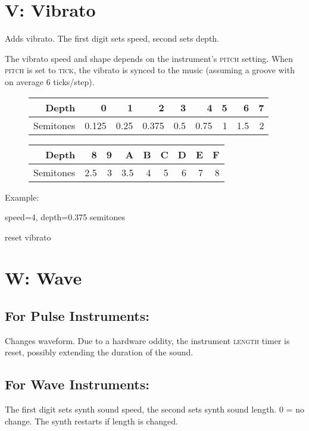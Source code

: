 \section{V: Vibrato}

Adds vibrato. The first digit sets speed, second sets depth.

The vibrato speed and shape depends on the instrument's \textsc{pitch} setting. When \textsc{pitch} is set to \textsc{tick}, the vibrato is synced to the music (assuming a groove with on average 6 ticks/step).

\begin{figure}[hbtp]
    \begin{tabular}{r|r|r|r|r|r|r|r|r}
        Depth & 0 & 1 & 2 & 3 & 4 & 5 & 6 & 7 \\
        \hline
        Semitones & 0.125 & 0.25 & 0.375 & 0.5 & 0.75 & 1 & 1.5 & 2 \\
    \end{tabular}

    \begin{tabular}{r|r|r|r|r|r|r|r|r}
        Depth & 8 & 9 & A & B & C & D & E & F \\
        \hline
        Semitones & 2.5 & 3 & 3.5 & 4 & 5 & 6 & 7 & 8 \\
    \end{tabular}
\end{figure}

\begin{description}
\item Example:
\item[V42] speed=4, depth=0.375 semitones
\item[V00] reset vibrato
\end{description}

\section{W: Wave}

\subsection{For Pulse Instruments:}
Changes waveform. Due to a hardware oddity, the instrument \textsc{length} timer is reset, possibly extending the duration of the sound.

\subsection{For Wave Instruments:}
The first digit sets synth sound speed, the second sets synth sound length. 0 = no change. The synth restarts if length is changed.

